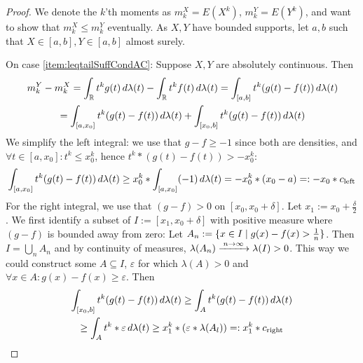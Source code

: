 \documentclass[a4paper]{scrreprt}
\let\epsilon\varepsilon
\begin{document}
    \begin{proof}
        \newcommand{\mkx}{m_k^X}
        \newcommand{\mky}{m_k^Y}
        We denote the $k$'th moments as $\mkx = E(X^k)$, $\mky = E(Y^k)$, and want to show that $\mkx \leq \mky$ eventually.
        As $X, Y$ have bounded supports, let $a, b$ 
        such that $X \in [a, b], Y \in [a, b]$ almost surely.
        
        On case \ref{item:leqtailSuffCondAC}: Suppose $X, Y$ are absolutely continuous. Then
        \begin{multline*}
            \mky - \mkx 
            = \lintegral{\R}{t^k g(t)}{\lambda(t)} - \lintegral{\R}{t^k f(t)}{\lambda(t)}
            = \lintegral{[a, b]}{t^k(g(t) - f(t))}{\lambda(t)} \\
            = \lintegral{[a, x_0]}{t^k (g(t) - f(t))}{\lambda(t)} + \lintegral{[x_0, b]}{t^k (g(t) - f(t))}{\lambda(t)} 
        \end{multline*}
        We simplify the left integral: we use that $g - f \geq -1$ since both are densities, and $\forall t \in [a, x_0]: t^k \leq x_0^k$, hence $t^k*(g(t) - f(t)) > -x_0^k$:
        \begin{gather*}
             \int_{[a, x_0]} t^k (g(t) - f(t)) \, d\lambda(t) 
             \geq x_0^k*\int_{[a, x_0]} (-1) \, d\lambda(t) 
             = - x_0^k*(x_0-a) 
             =: - x_0 * c_{\text{left}}
        \end{gather*}
        For the right integral, we use that $(g - f) > 0$ on $[x_0, x_0 + \delta]$. Let $x_1 := x_0 + \frac{\delta}{2}$.
        We first identify a subset of $I := [x_1, x_0 + \delta]$ with positive measure where $(g-f)$ is bounded away from zero:
        Let $A_n := \{x \in I \mid g(x) - f(x) > \frac{1}{n}\}$.
        Then $I = \bigcup_n A_n$ and by continuity of measures, $\lambda(A_n) \xrightarrow{\;n \to \infty\;} \lambda(I) > 0$. This way we could construct some $A \subseteq I$, $\epsilon$ for which $\lambda(A) > 0$ and $\forall x \in A: g(x) - f(x) \geq \epsilon$. 
        Then
        \begin{multline*}
            \lintegral{[x_0, b]}{t^k (g(t) - f(t))}{\lambda(t)} 
            \geq \lintegral{A}{t^k (g(t) - f(t))}{\lambda(t)} \\
            \geq \lintegral{A}{t^k * \epsilon}{\lambda(t)}
            \geq x_1^k * (\epsilon * \lambda(A_l))
            =: x_1^k * c_{\text{right}}
        \end{multline*}
        

\end{proof}
\end{document}
